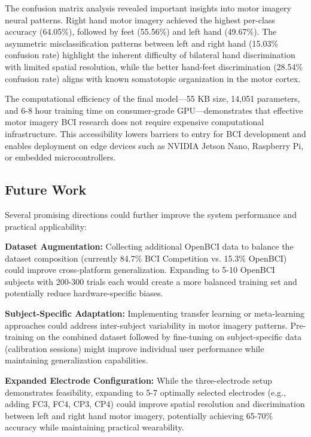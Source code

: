 The confusion matrix analysis revealed important insights into motor imagery neural patterns. Right hand motor imagery achieved the highest per-class accuracy (64.05\%), followed by feet (55.56\%) and left hand (49.67\%). The asymmetric misclassification patterns between left and right hand (15.03\% confusion rate) highlight the inherent difficulty of bilateral hand discrimination with limited spatial resolution, while the better hand-feet discrimination (28.54\% confusion rate) aligns with known somatotopic organization in the motor cortex.

The computational efficiency of the final model—55 KB size, 14,051 parameters, and 6-8 hour training time on consumer-grade GPU—demonstrates that effective motor imagery BCI research does not require expensive computational infrastructure. This accessibility lowers barriers to entry for BCI development and enables deployment on edge devices such as NVIDIA Jetson Nano, Raspberry Pi, or embedded microcontrollers.

\subsection{Future Work}

Several promising directions could further improve the system performance and practical applicability:

\textbf{Dataset Augmentation:} Collecting additional OpenBCI data to balance the dataset composition (currently 84.7\% BCI Competition vs. 15.3\% OpenBCI) could improve cross-platform generalization. Expanding to 5-10 OpenBCI subjects with 200-300 trials each would create a more balanced training set and potentially reduce hardware-specific biases.

\textbf{Subject-Specific Adaptation:} Implementing transfer learning or meta-learning approaches could address inter-subject variability in motor imagery patterns. Pre-training on the combined dataset followed by fine-tuning on subject-specific data (calibration sessions) might improve individual user performance while maintaining generalization capabilities.

\textbf{Expanded Electrode Configuration:} While the three-electrode setup demonstrates feasibility, expanding to 5-7 optimally selected electrodes (e.g., adding FC3, FC4, CP3, CP4) could improve spatial resolution and discrimination between left and right hand motor imagery, potentially achieving 65-70\% accuracy while maintaining practical wearability.

